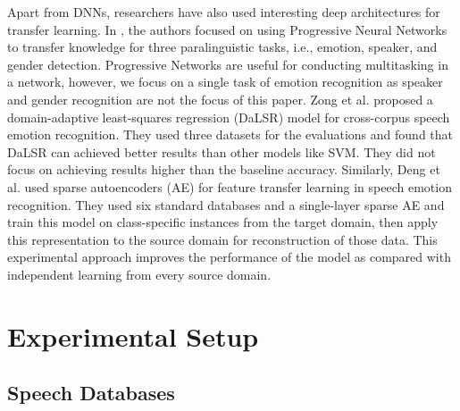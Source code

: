 \documentclass[a4paper]{article}
\begin{document}
Apart from DNNs, researchers have also used interesting deep architectures for transfer learning. In \cite{gideon2017progressive}, the authors focused on using Progressive Neural Networks to transfer knowledge for three paralinguistic tasks, i.e., emotion, speaker, and gender detection. Progressive Networks are useful for conducting multitasking in a network, however, we focus on a single task of emotion recognition as speaker and gender recognition are not the focus of this paper. Zong et al. \cite{zong2016cross} proposed a domain-adaptive least-squares regression (DaLSR) model for cross-corpus speech emotion recognition. They used three datasets for the evaluations and found that DaLSR can achieved better results than other models like SVM. They did not focus on achieving results higher than the baseline accuracy. Similarly, Deng et al. \cite{deng2013sparse} used sparse autoencoders (AE) for feature transfer learning in speech emotion recognition.  They used six standard databases and a single-layer sparse AE and train this model on class-specific instances from the target domain, then apply this representation to the source domain for reconstruction of those data. This experimental approach improves the performance of the model as compared with independent learning from every source domain. 


\section{Experimental Setup}
\label{ES}
\subsection{Speech Databases}
\label{sec:datasets}
\end{document}
